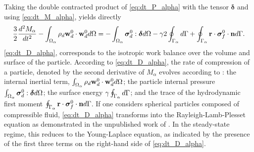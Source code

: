Taking the double contracted product of \ref{eq:dt_P_alpha} with the tensor $\bm\delta$ and using \ref{eq:dt_M_alpha}, yields directly  
\begin{equation}
    \frac{3}{2}\frac{d^2 M_\alpha}{dt^2}
    - \int_{\Omega_{\alpha}}  \rho_d \textbf{w}_d^0 \cdot \textbf{w}_d^0 d\Omega
    = 
    - \int_{\Omega_{\alpha}} \bm\sigma_d^0:\bm\delta d\Omega 
    - \gamma 2 \oint_{\Gamma_{\alpha}}  d\Gamma
    + \oint_{\Gamma_{\alpha}} \textbf{r}\cdot\bm\sigma_f^0\cdot \textbf{n} d\Gamma.
    \label{eq:dt_D_alpha}
\end{equation}
\ref{eq:dt_D_alpha}, corresponds to the isotropic work balance over the volume and surface of the particle. 
According to \ref{eq:dt_D_alpha}, the rate of compression of a particle, denoted by the second derivative of $M_\alpha$ evolves according to : 
the internal inertial term, $\int_{\Omega_{\alpha}} \rho_d \textbf{w}_d^0 \cdot \textbf{w}_d^0  d\Omega$;
the particle internal pressure $\int_{\Omega_{\alpha}} \bm\sigma_d^0:\bm\delta d\Omega$; 
the surface energy $\gamma\oint_{\Gamma_{\alpha}}    d\Gamma$; 
and the trace of the hydrodynamic first moment $\oint_{\Gamma_{\alpha}} \textbf{r}\cdot\bm\sigma_f^0\cdot \textbf{n} d\Gamma$.
If one considers spherical particles composed of compressible fluid, \ref{eq:dt_D_alpha} transforms into the Rayleigh-Lamb-Plesset equation as demonstrated in the unpublished work of \citep{danielcours}. 
In the steady-state regime, this reduces to the Young-Laplace equation, as indicated by the presence of the first three terms on the right-hand side of \ref{eq:dt_D_alpha}. 

